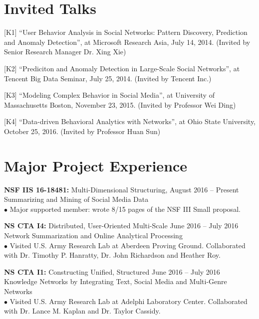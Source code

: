 \documentclass[margin, 10pt]{res}
\begin{document}
\begin{resume}

\section{Invited Talks}

[K1] ``User Behavior Analysis in Social Networks: Pattern Discovery, Prediction and Anomaly Detection'', at Microsoft Research Asia, July 14, 2014. (Invited by Senior Research Manager Dr. Xing Xie)

[K2] ``Prediciton and Anomaly Detection in Large-Scale Social Networks'', at Tencent Big Data Seminar, July 25, 2014. (Invited by Tencent Inc.)

[K3] ``Modeling Complex Behavior in Social Media'', at University of Massachusetts Boston, November 23, 2015. (Invited by Professor Wei Ding)

[K4] ``Data-driven Behavioral Analytics with Networks'', at Ohio State University, October 25, 2016. (Invited by Professor Huan Sun)


\section{Major Project Experience}

{\textbf{NSF IIS 16-18481:} Multi-Dimensional Structuring,} \hfill{August 2016 -- Present} \\
{Summarizing and Mining of Social Media Data} \\
$\bullet$ Major supported member: wrote 8/15 pages of the NSF III Small proposal.

{\textbf{NS CTA I4:} Distributed, User-Oriented Multi-Scale} \hfill{June 2016 -- July 2016} \\
{Network Summarization and Online Analytical Processing} \\
$\bullet$ Visited U.S. Army Research Lab at Aberdeen Proving Ground.
Collaborated with Dr. Timothy P. Hanratty, Dr. John Richardson and Heather Roy.

{\textbf{NS CTA I1:} Constructing Unified, Structured} \hfill{June 2016 -- July 2016} \\
{Knowledge Networks by Integrating Text, Social Media and Multi-Genre Networks} \hfill{} \\
$\bullet$ Visited U.S. Army Research Lab at Adelphi Laboratory Center. Collaborated with Dr. Lance M. Kaplan and Dr. Taylor Cassidy.


\end{resume}
\end{document}
